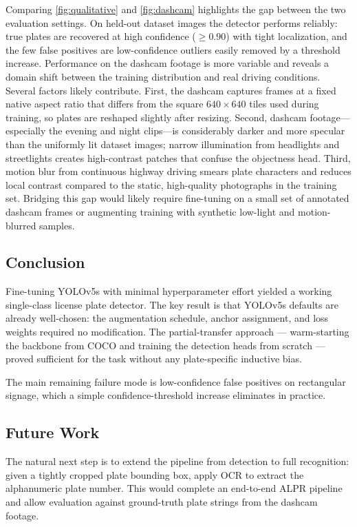 \documentclass[times,10pt,twocolumn]{article}
\begin{document}
Comparing \cref{fig:qualitative} and \cref{fig:dashcam} highlights the gap
between the two evaluation settings. On held-out dataset images the detector
performs reliably: true plates are recovered at high confidence
($\ge\!0.90$) with tight localization, and the few false positives are
low-confidence outliers easily removed by a threshold increase. Performance
on the dashcam footage is more variable and reveals a domain shift between
the training distribution and real driving conditions. Several factors likely
contribute. First, the dashcam captures frames at a fixed native aspect ratio
that differs from the square $640\!\times\!640$ tiles used during training,
so plates are reshaped slightly after resizing. Second, dashcam footage---especially
the evening and night clips---is considerably darker and more specular than
the uniformly lit dataset images; narrow illumination from headlights and
streetlights creates high-contrast patches that confuse the objectness head.
Third, motion blur from continuous highway driving smears plate characters
and reduces local contrast compared to the static, high-quality photographs
in the training set. Bridging this gap would likely require fine-tuning on a
small set of annotated dashcam frames or augmenting training with synthetic
low-light and motion-blurred samples.

\subsection{Conclusion}
Fine-tuning YOLOv5s with minimal hyperparameter effort yielded a
working single-class license plate detector. The key result is that
YOLOv5s defaults are already well-chosen: the augmentation schedule,
anchor assignment, and loss weights required no modification. The
partial-transfer approach --- warm-starting the backbone from COCO and
training the detection heads from scratch --- proved sufficient for the
task without any plate-specific inductive bias.

The main remaining failure mode is low-confidence false positives on
rectangular signage, which a simple confidence-threshold increase
eliminates in practice.

\subsection{Future Work}
\label{sec:future}
The natural next step is to extend the pipeline from detection to full
recognition: given a tightly cropped plate bounding box, apply OCR to
extract the alphanumeric plate number. This would complete an end-to-end
ALPR pipeline and allow evaluation against ground-truth plate strings
from the dashcam footage.
\end{document}
